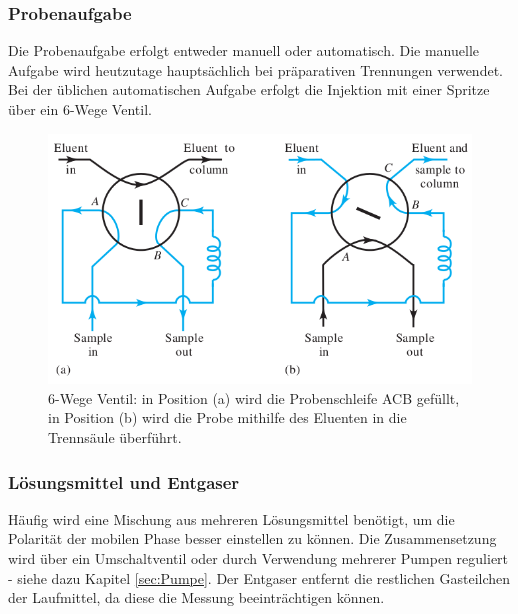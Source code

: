      \subsubsection{Probenaufgabe}
       
       Die Probenaufgabe erfolgt entweder manuell oder automatisch. Die manuelle Aufgabe wird heutzutage hauptsächlich bei präparativen Trennungen verwendet. Bei der üblichen automatischen Aufgabe erfolgt die Injektion mit einer Spritze über ein 6-Wege Ventil. \citep{SkriptHPLC}
       
         \begin{figure}[H]
           \includegraphics[scale=0.3, center]{images/Funktionsweise6WegeVentil.png} 
           \caption[Beschreibung der Funktionsweise des 6-Wege Ventil, Quelle: \citep{InstrumentelleAnalytikSkoog}]{6-Wege Ventil: in Position (a) wird die Probenschleife ACB gefüllt, in Position (b) wird die Probe mithilfe des Eluenten in die Trennsäule überführt.}
           \label{fig:SechsWegeVentil}
         \end{figure}
         
     \subsubsection{Lösungsmittel und Entgaser}
       
       Häufig wird eine Mischung aus mehreren Lösungsmittel benötigt, um die Polarität der mobilen Phase besser einstellen zu können. Die Zusammensetzung wird über ein Umschaltventil oder durch Verwendung mehrerer Pumpen reguliert - siehe dazu Kapitel \ref{sec:Pumpe}. Der Entgaser entfernt die restlichen Gasteilchen der Laufmittel, da diese die Messung beeinträchtigen können. \citep[S. 749]{InstrumentelleAnalytikSkoog}
       
